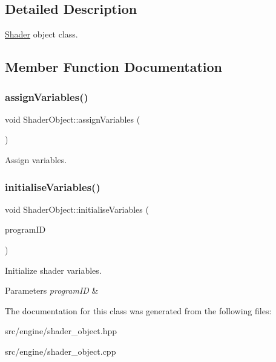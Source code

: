 \subsection{Detailed Description}
\mbox{\hyperlink{classShader}{Shader}} object class. 



\subsection{Member Function Documentation}
\mbox{\label{classShaderObject_a8af6206a15f133307bf264aa7007e9bf}} 
\subsubsection{\texorpdfstring{assignVariables()}{assignVariables()}}
{\footnotesize\ttfamily void Shader\+Object\+::assign\+Variables (\begin{DoxyParamCaption}{ }\end{DoxyParamCaption})\hspace{0.3cm}{\ttfamily [protected]}}



Assign variables. 

\mbox{\label{classShaderObject_acf1fe66dee8d8163415ab9fe8088d574}} 
\subsubsection{\texorpdfstring{initialiseVariables()}{initialiseVariables()}}
{\footnotesize\ttfamily void Shader\+Object\+::initialise\+Variables (\begin{DoxyParamCaption}\item[{G\+Luint}]{program\+ID }\end{DoxyParamCaption})\hspace{0.3cm}{\ttfamily [protected]}}



Initialize shader variables. 


\begin{DoxyParams}{Parameters}
{\em program\+ID} & \\
\hline
\end{DoxyParams}


The documentation for this class was generated from the following files\+:\begin{DoxyCompactItemize}
\item 
src/engine/shader\+\_\+object.\+hpp\item 
src/engine/shader\+\_\+object.\+cpp\end{DoxyCompactItemize}
